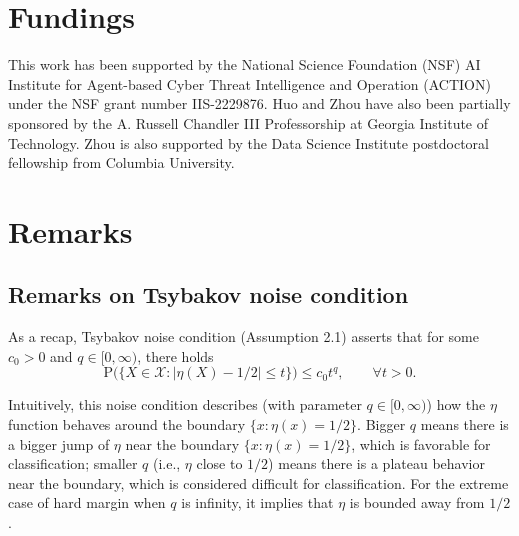 \documentclass{article}
\begin{document}
\section*{Fundings} 
This work has been supported by the National Science Foundation (NSF) AI Institute for Agent-based Cyber Threat Intelligence and Operation (ACTION) under the NSF grant number IIS-2229876. 
Huo and Zhou have also been partially sponsored by the A. Russell Chandler III Professorship at Georgia Institute of Technology. 
Zhou is also supported by the Data Science Institute postdoctoral fellowship from Columbia University.

% 


\newpage

\appendix
\setcounter{section}{0}
\renewcommand{\thesection}{\arabic{section}}
\section{Remarks}
\subsection{Remarks on Tsybakov noise condition}
As a recap, Tsybakov noise condition (Assumption 2.1) asserts that for some $c_0>0$ and $q\in [0,\infty)$, there holds $$\mathrm{P}\bigl(\{X\in \mathcal{X} : |\eta(X) -1/2| \leq t\}\bigr) \leq c_0t^q,\qquad \forall t>0.$$ 

Intuitively, this noise condition describes (with parameter $q \in [0, \infty)$) how the $\eta$ function behaves around the boundary $\{x: \eta(x) =1/2\}$. 
Bigger $q$ means there is a bigger jump of $\eta$ near the boundary $\{x: \eta(x) =1/2\}$, which is favorable for classification; smaller $q$ (i.e., $\eta$ close to $1/2$) means there is a plateau behavior near the boundary, which is considered difficult for classification. For the extreme case of hard margin when $q$ is
infinity, it implies that $\eta$ is bounded away from $1/2$.
\end{document}
